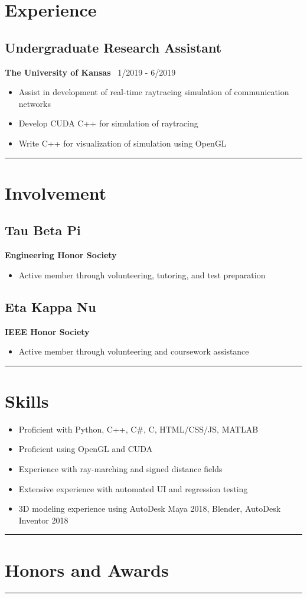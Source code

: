 \documentclass[11pt, letterpaper]{article}
\newenvironment{desItemize}
{ \begin{itemize}[leftmargin=*, topsep=1pt]
    \setlength{\itemsep}{0pt}
    \setlength{\parskip}{0pt}
    \setlength{\parsep}{0pt}
    \small     }
{ \end{itemize}                  }
\newcommand{\columnRule}{
    \noindent\hspace{-0.5\columnsep}\rule{\columnwidth + \columnsep/2}{1pt}\noindent
}
\newenvironment{leftSection}[1]
{\section*{#1}}
{\rule{\columnwidth + \columnsep/2}{1pt}}
\newenvironment{rightSection}[1]
{\section*{#1}}
{\columnRule}
\begin{document}
\begin{multicols*}{2}[]
\begin{leftSection}{Experience}
    \subsection*{Undergraduate Research Assistant}
    \textbf{The University of Kansas}\hfill
    \faCalendar\ 1/2019 - 6/2019
    \begin{desItemize}
        \item	Assist in development of real-time raytracing simulation of communication networks
        \item	Develop CUDA C++ for simulation of raytracing
        \item	Write C++ for visualization of simulation using OpenGL
    \end{desItemize}
\end{leftSection}
\begin{leftSection}{Involvement}
    \subsection*{Tau Beta Pi}
    \textbf{Engineering Honor Society}
    \begin{desItemize}
    \item Active member through volunteering, tutoring, and test preparation
    \end{desItemize}

    \subsection*{Eta Kappa Nu}
    \textbf{IEEE Honor Society}
    \begin{desItemize}
    \item Active member through volunteering and coursework assistance
    \end{desItemize}
\end{leftSection}
\columnbreak
\begin{rightSection}{Skills}
    \begin{desItemize}
    \item	Proficient with Python, C++, C\#, C, HTML/CSS/JS, MATLAB
    \item	Proficient using OpenGL and CUDA
    \item	Experience with ray-marching and signed distance fields
    \item	Extensive experience with automated UI and regression testing
    \item	3D modeling experience using AutoDesk Maya 2018, Blender, AutoDesk Inventor 2018
    \end{desItemize}
\end{rightSection}
\begin{rightSection}{Honors and Awards}

\end{rightSection}
\end{multicols*}
\end{document}
